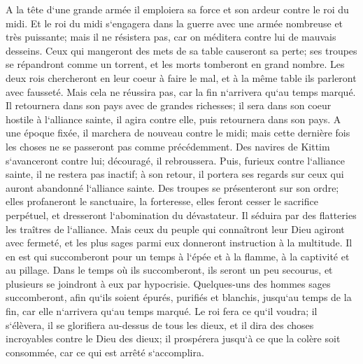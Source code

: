 \verse A la tête d`une grande armée il emploiera sa force et son ardeur contre le roi du midi. Et le roi du midi s`engagera dans la guerre avec une armée nombreuse et très puissante; mais il ne résistera pas, car on méditera contre lui de mauvais desseins. 
\verse Ceux qui mangeront des mets de sa table causeront sa perte; ses troupes se répandront comme un torrent, et les morts tomberont en grand nombre. 
\verse Les deux rois chercheront en leur coeur à faire le mal, et à la même table ils parleront avec fausseté. Mais cela ne réussira pas, car la fin n`arrivera qu`au temps marqué. 
\verse Il retournera dans son pays avec de grandes richesses; il sera dans son coeur hostile à l`alliance sainte, il agira contre elle, puis retournera dans son pays. 
\verse A une époque fixée, il marchera de nouveau contre le midi; mais cette dernière fois les choses ne se passeront pas comme précédemment. 
\verse Des navires de Kittim s`avanceront contre lui; découragé, il rebroussera. Puis, furieux contre l`alliance sainte, il ne restera pas inactif; à son retour, il portera ses regards sur ceux qui auront abandonné l`alliance sainte. 
\verse Des troupes se présenteront sur son ordre; elles profaneront le sanctuaire, la forteresse, elles feront cesser le sacrifice perpétuel, et dresseront l`abomination du dévastateur. 
\verse Il séduira par des flatteries les traîtres de l`alliance. Mais ceux du peuple qui connaîtront leur Dieu agiront avec fermeté, 
\verse et les plus sages parmi eux donneront instruction à la multitude. Il en est qui succomberont pour un temps à l`épée et à la flamme, à la captivité et au pillage. 
\verse Dans le temps où ils succomberont, ils seront un peu secourus, et plusieurs se joindront à eux par hypocrisie. 
\verse Quelques-uns des hommes sages succomberont, afin qu`ils soient épurés, purifiés et blanchis, jusqu`au temps de la fin, car elle n`arrivera qu`au temps marqué. 
\verse Le roi fera ce qu`il voudra; il s`élèvera, il se glorifiera au-dessus de tous les dieux, et il dira des choses incroyables contre le Dieu des dieux; il prospérera jusqu`à ce que la colère soit consommée, car ce qui est arrêté s`accomplira. 
